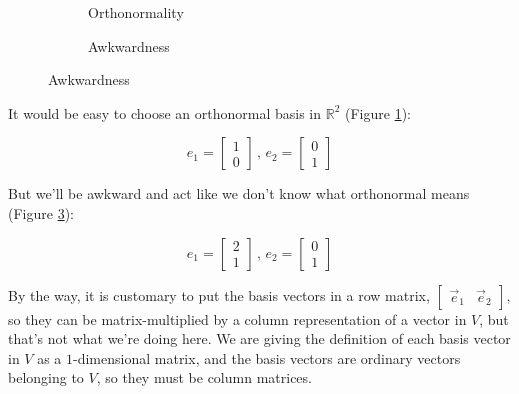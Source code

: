 \begin{figure}[h]
    \caption{Basis vectors in $\mathbb{R}^2$}
    \begin{subfigure}{0.5\textwidth}
        \centering
        \caption{Orthonormality} \label{fig:vectors-orthonormality}
    \end{subfigure}
    \begin{subfigure}{0.5\textwidth}
        \centering
        \caption{Awkwardness} \label{fig:vectors-awkwardness}
    \end{subfigure}
\end{figure}

It would be easy to choose an orthonormal basis in $\mathbb{R}^2$ (Figure \ref{fig:vectors-orthonormality}):

$$
e_1 = \begin{bmatrix}1 \\ 0\end{bmatrix}\,,\,
e_2 = \begin{bmatrix}0 \\ 1\end{bmatrix}
$$

But we'll be awkward and act like we don't know what orthonormal means (Figure \ref{fig:vectors-awkwardness}):

$$
e_1 = \begin{bmatrix}2 \\ 1\end{bmatrix}\,,\,
e_2 = \begin{bmatrix}0 \\ 1\end{bmatrix}
$$

By the way, it is customary to put the basis vectors in a row matrix, $\begin{bmatrix}\vec{e}_1 & \vec{e}_2\end{bmatrix}$, so they can be matrix-multiplied by a column representation of a vector in $V$, but that's not what we're doing here. We are giving the definition of each basis vector in $V$ as a $1$-dimensional matrix, and the basis vectors are ordinary vectors belonging to $V$, so they must be column matrices.


